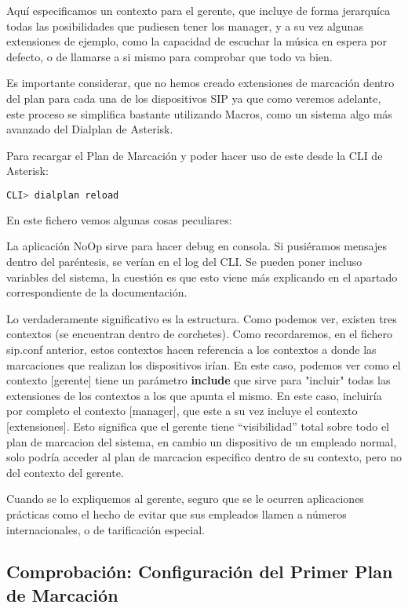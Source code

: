 Aquí especificamos un contexto para el gerente, que incluye de forma jerarquíca todas las posibilidades que pudiesen tener los manager, y a su vez algunas extensiones de ejemplo, como la capacidad de escuchar la música en espera por defecto, o de llamarse a si mismo para comprobar que todo va bien.

Es importante considerar, que no hemos creado extensiones de marcación dentro del plan para cada una de los dispositivos SIP ya que como veremos adelante, este proceso se simplifica bastante utilizando Macros, como un sistema algo más avanzado del Dialplan de Asterisk.

Para recargar el Plan de Marcación y poder hacer uso de este desde la CLI de Asterisk:

\begin{lstlisting}[language=sh]
CLI> dialplan reload
\end{lstlisting}

 En este fichero vemos algunas cosas peculiares:

La aplicación NoOp sirve para hacer debug en consola. Si pusiéramos mensajes dentro del paréntesis, se verían en el log del CLI. Se pueden poner incluso variables del sistema, la cuestión es que esto viene más explicando en el apartado correspondiente de la documentación.

Lo verdaderamente significativo es la estructura. Como podemos ver, existen tres contextos (se encuentran dentro de corchetes). Como recordaremos, en el fichero sip.conf anterior, estos contextos hacen referencia a los contextos a donde las marcaciones que realizan los dispositivos irían. En este caso, podemos ver como el contexto [gerente] tiene un parámetro \textbf{include} que sirve para "incluir" todas las extensiones de los contextos a los que apunta el mismo. En este caso, incluiría por completo el contexto [manager], que este a su vez incluye el contexto [extensiones]. Esto significa que el gerente tiene ``visibilidad'' total sobre todo el plan de marcacion del sistema, en cambio un dispositivo de un empleado normal, solo podría acceder al plan de marcacion especifico dentro de su contexto, pero no del contexto del gerente.

Cuando se lo expliquemos al gerente, seguro que se le ocurren aplicaciones prácticas como el hecho de evitar que sus empleados llamen a números internacionales, o de tarificación especial.

\subsection{Comprobación: Configuración del Primer Plan de Marcación}

